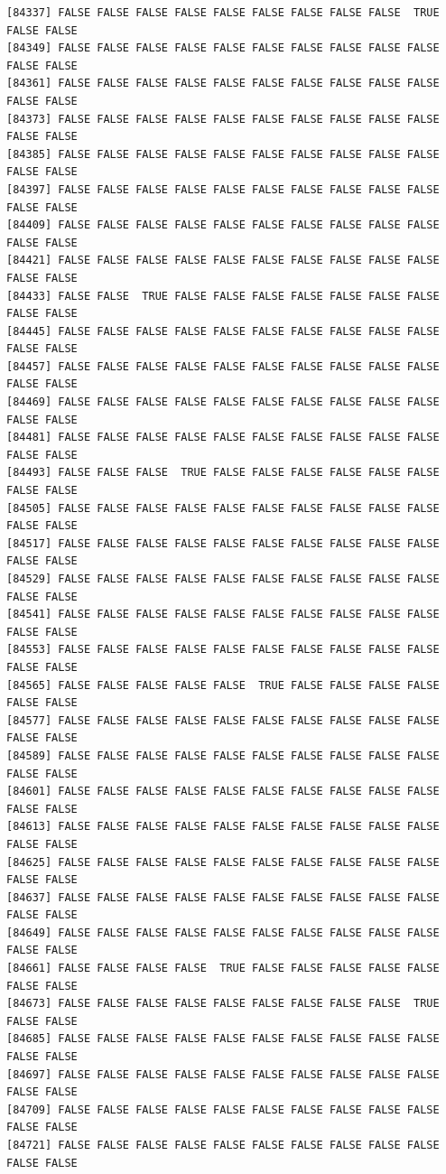 \documentclass[
  a4paper,
  DIV=11,
  numbers=noendperiod]{scrartcl}
\begin{document}
\begin{verbatim}
[84337] FALSE FALSE FALSE FALSE FALSE FALSE FALSE FALSE FALSE  TRUE FALSE FALSE
[84349] FALSE FALSE FALSE FALSE FALSE FALSE FALSE FALSE FALSE FALSE FALSE FALSE
[84361] FALSE FALSE FALSE FALSE FALSE FALSE FALSE FALSE FALSE FALSE FALSE FALSE
[84373] FALSE FALSE FALSE FALSE FALSE FALSE FALSE FALSE FALSE FALSE FALSE FALSE
[84385] FALSE FALSE FALSE FALSE FALSE FALSE FALSE FALSE FALSE FALSE FALSE FALSE
[84397] FALSE FALSE FALSE FALSE FALSE FALSE FALSE FALSE FALSE FALSE FALSE FALSE
[84409] FALSE FALSE FALSE FALSE FALSE FALSE FALSE FALSE FALSE FALSE FALSE FALSE
[84421] FALSE FALSE FALSE FALSE FALSE FALSE FALSE FALSE FALSE FALSE FALSE FALSE
[84433] FALSE FALSE  TRUE FALSE FALSE FALSE FALSE FALSE FALSE FALSE FALSE FALSE
[84445] FALSE FALSE FALSE FALSE FALSE FALSE FALSE FALSE FALSE FALSE FALSE FALSE
[84457] FALSE FALSE FALSE FALSE FALSE FALSE FALSE FALSE FALSE FALSE FALSE FALSE
[84469] FALSE FALSE FALSE FALSE FALSE FALSE FALSE FALSE FALSE FALSE FALSE FALSE
[84481] FALSE FALSE FALSE FALSE FALSE FALSE FALSE FALSE FALSE FALSE FALSE FALSE
[84493] FALSE FALSE FALSE  TRUE FALSE FALSE FALSE FALSE FALSE FALSE FALSE FALSE
[84505] FALSE FALSE FALSE FALSE FALSE FALSE FALSE FALSE FALSE FALSE FALSE FALSE
[84517] FALSE FALSE FALSE FALSE FALSE FALSE FALSE FALSE FALSE FALSE FALSE FALSE
[84529] FALSE FALSE FALSE FALSE FALSE FALSE FALSE FALSE FALSE FALSE FALSE FALSE
[84541] FALSE FALSE FALSE FALSE FALSE FALSE FALSE FALSE FALSE FALSE FALSE FALSE
[84553] FALSE FALSE FALSE FALSE FALSE FALSE FALSE FALSE FALSE FALSE FALSE FALSE
[84565] FALSE FALSE FALSE FALSE FALSE  TRUE FALSE FALSE FALSE FALSE FALSE FALSE
[84577] FALSE FALSE FALSE FALSE FALSE FALSE FALSE FALSE FALSE FALSE FALSE FALSE
[84589] FALSE FALSE FALSE FALSE FALSE FALSE FALSE FALSE FALSE FALSE FALSE FALSE
[84601] FALSE FALSE FALSE FALSE FALSE FALSE FALSE FALSE FALSE FALSE FALSE FALSE
[84613] FALSE FALSE FALSE FALSE FALSE FALSE FALSE FALSE FALSE FALSE FALSE FALSE
[84625] FALSE FALSE FALSE FALSE FALSE FALSE FALSE FALSE FALSE FALSE FALSE FALSE
[84637] FALSE FALSE FALSE FALSE FALSE FALSE FALSE FALSE FALSE FALSE FALSE FALSE
[84649] FALSE FALSE FALSE FALSE FALSE FALSE FALSE FALSE FALSE FALSE FALSE FALSE
[84661] FALSE FALSE FALSE FALSE  TRUE FALSE FALSE FALSE FALSE FALSE FALSE FALSE
[84673] FALSE FALSE FALSE FALSE FALSE FALSE FALSE FALSE FALSE  TRUE FALSE FALSE
[84685] FALSE FALSE FALSE FALSE FALSE FALSE FALSE FALSE FALSE FALSE FALSE FALSE
[84697] FALSE FALSE FALSE FALSE FALSE FALSE FALSE FALSE FALSE FALSE FALSE FALSE
[84709] FALSE FALSE FALSE FALSE FALSE FALSE FALSE FALSE FALSE FALSE FALSE FALSE
[84721] FALSE FALSE FALSE FALSE FALSE FALSE FALSE FALSE FALSE FALSE FALSE FALSE

\end{verbatim}
\end{document}
